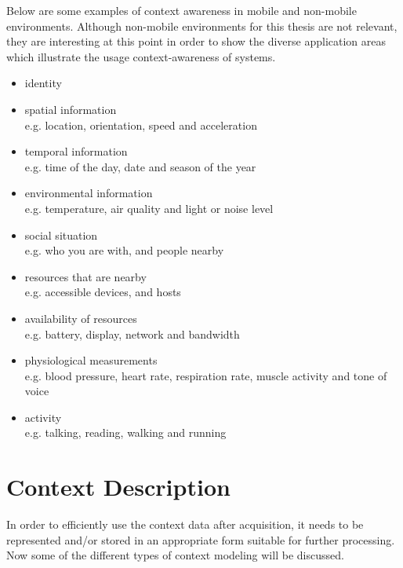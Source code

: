 Below are some examples of context awareness in mobile and non-mobile environments. Although non-mobile environments for this thesis are not relevant, they are interesting at this point in order to show the diverse application areas which illustrate the usage context-awareness of systems.

\begin{itemize}
\item identity
\item spatial information\\
e.g. location, orientation, speed and acceleration
\item temporal information\\
e.g. time of the day, date and season of the year
\item environmental information\\
e.g. temperature, air quality and light or noise level
\item social situation\\
e.g. who you are with, and people nearby
\item resources that are nearby\\
e.g. accessible devices, and hosts
\item availability of resources\\
e.g. battery, display, network and bandwidth
\item physiological measurements\\
e.g. blood pressure, heart rate, respiration rate, muscle activity and tone of voice
\item activity\\
e.g. talking, reading, walking and running
\end{itemize}

\section{Context Description\label{sec:back_con_de}}
In order to efficiently use the context data after acquisition, it needs to be represented and/or stored in an appropriate form suitable for further processing. Now some of the different types of context modeling will be discussed.

